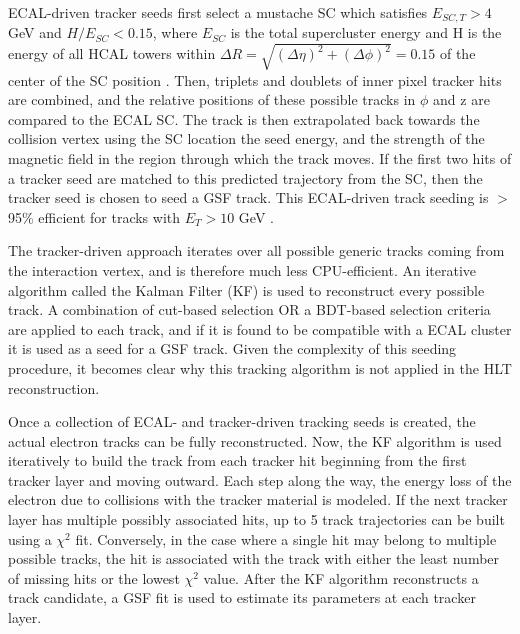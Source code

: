 \documentclass[12pt]{ucsddissertation}
\begin{document}
ECAL-driven tracker seeds first select a mustache SC which satisfies $E_{SC,T} > 4$ GeV and $H/E_{SC} < 0.15$, where $E_{SC}$ is the total supercluster energy and H is the energy of all HCAL towers within $\Delta R = \sqrt{(\Delta \eta)^2 + (\Delta \phi)^2} = 0.15$ of the center of the SC position \cite{OfflineReco2021}. Then, triplets and doublets of inner pixel tracker hits are combined, and the relative positions of these possible tracks in $\phi$ and z are compared to the ECAL SC. The track is then extrapolated back towards the collision vertex using the SC location the seed energy, and the strength of the magnetic field in the region through which the track moves. If the first two hits of a tracker seed are matched to this predicted trajectory from the SC, then the tracker seed is chosen to seed a GSF track. This ECAL-driven track seeding is $>$ 95\% efficient for tracks with $E_T > 10$ GeV \cite{OfflineReco2021}.

The tracker-driven approach iterates over all possible generic tracks coming from the interaction vertex, and is therefore much less CPU-efficient. An iterative algorithm called the Kalman Filter (KF) is used to reconstruct every possible track. A combination of cut-based selection OR a BDT-based selection criteria are applied to each track, and if it is found to be compatible with a ECAL cluster it is used as a seed for a GSF track. Given the complexity of this seeding procedure, it becomes clear why this tracking algorithm is not applied in the HLT reconstruction.

Once a collection of ECAL- and tracker-driven tracking seeds is created, the actual electron tracks can be fully reconstructed. Now, the KF algorithm is used iteratively to build the track from each tracker hit beginning from the first tracker layer and moving outward. Each step along the way, the energy loss of the electron due to collisions with the tracker material is modeled. If the next tracker layer has multiple possibly associated hits, up to 5 track trajectories can be built using a $\chi^2$ fit. Conversely, in the case where a single hit may belong to multiple possible tracks, the hit is associated with the track with either the least number of missing hits or the lowest $\chi^2$ value. After the KF algorithm reconstructs a track candidate, a GSF fit is used to estimate its parameters at each tracker layer.
\end{document}
